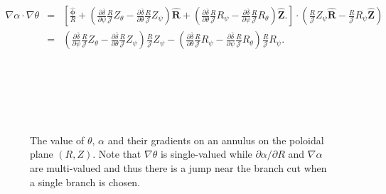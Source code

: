 \documentclass{llncs}
\newcommand{\tmmathbf}[1]{\ensuremath{\boldsymbol{#1}}}
\begin{document}
\begin{eqnarray}
  \nabla \alpha \cdot \nabla \theta & = & \left[
  \frac{\hat{\tmmathbf{\phi}}}{R} + \left( \frac{\partial
  \overline{\delta}}{\partial \psi} \frac{R}{\mathcal{J}} Z_{\theta} -
  \frac{\partial \overline{\delta}}{\partial \theta} \frac{R}{\mathcal{J}}
  Z_{\psi} \right) \hat{\mathbf{R}} + \left( \frac{\partial
  \overline{\delta}}{\partial \theta} \frac{R}{\mathcal{J}} R_{\psi} -
  \frac{\partial \overline{\delta}}{\partial \psi} \frac{R}{\mathcal{J}}
  R_{\theta} \right) \hat{\mathbf{Z}} . \right] \cdot \left(
  \frac{R}{\mathcal{J}} Z_{\psi} \hat{\mathbf{R}} - \frac{R}{\mathcal{J}}
  R_{\psi} \hat{\mathbf{Z}} \right) \nonumber\\
  & = & \left( \frac{\partial \overline{\delta}}{\partial \psi}
  \frac{R}{\mathcal{J}} Z_{\theta} - \frac{\partial
  \overline{\delta}}{\partial \theta} \frac{R}{\mathcal{J}} Z_{\psi} \right)
  \frac{R}{\mathcal{J}} Z_{\psi} - \left( \frac{\partial
  \overline{\delta}}{\partial \theta} \frac{R}{\mathcal{J}} R_{\psi} -
  \frac{\partial \overline{\delta}}{\partial \psi} \frac{R}{\mathcal{J}}
  R_{\theta} \right) \frac{R}{\mathcal{J}} R_{\psi} . 
\end{eqnarray}


\

\

\begin{figure}[h]
  
  
  \
  
  \caption{\label{17-11-10-p1}The value of $\theta$, $\alpha$ and their
  gradients on an annulus on the poloidal plane $(R, Z)$. Note that $\nabla
  \theta$ is single-valued while $\partial \alpha / \partial R$ and $\nabla
  \alpha$ are multi-valued and thus there is a jump near the branch cut when a
  single branch is chosen.}
\end{figure}
\end{document}

